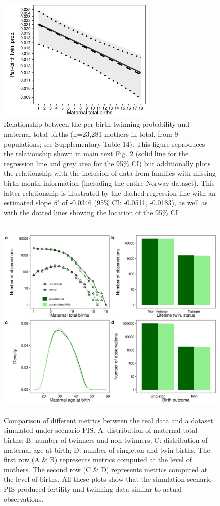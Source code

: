 \documentclass[a4paper]{article}\usepackage[]{graphicx}\usepackage[]{color}
\begin{document}
\begin{figure}[H]
\begin{center}
\includegraphics[height = 6cm]{../figures/figS5.pdf}
\end{center}
\caption{Relationship between the per-birth twinning probability and maternal total births (n=23,281 mothers in total, from 9 populations; see Supplementary Table 14). This figure reproduces the relationship shown in main text Fig. 2 (solid line for the regression line and grey area for the 95\% CI) but additionally plots the relationship with the inclusion of data from families with missing birth month information (including the entire Norway dataset). This latter relationship is illustrated by the dashed regression line with an estimated slope $\beta'$ of -0.0346 (95\% CI: -0.0511, -0.0183), as well as with the dotted lines showing the location of the 95\% CI.}
\end{figure}

\begin{figure}[H]
\begin{center}
\includegraphics[height = 10cm]{../figures/figS6.pdf}
\end{center}
\caption{Comparison of different metrics between the real data and a dataset simulated under scenario PIS. A: distribution of maternal total births; B: number of twinners and non-twinners; C: distribution of maternal age at birth; D: number of singleton and twin births. The first row (A \& B) represents metrics computed at the level of mothers. The second row (C \& D) represents metrics computed at the level of births. All these plots show that the simulation scenario PIS produced fertility and twinning data similar to actual observations.}
\end{figure}
\end{document}
